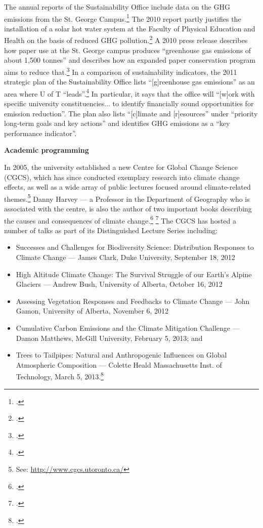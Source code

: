 The annual reports of the Sustainability Office include data on the GHG emissions from the St. George Campus.\footcite[][]{UTSustOffice2010report}
The 2010 report partly justifies the installation of a solar hot water system at the Faculty of Physical Education and Health on the basis of reduced GHG pollution.\footcite[][p. 17]{UTSustOffice2010report}
A 2010 press release describes how paper use at the St. George campus produces ``greenhouse gas emissions of about 1,500 tonnes'' and describes how an expanded paper conservation program aims to reduce that.\footcite[][]{UTGoingGreener2010}
In a comparison of sustainability indicators, the 2011 strategic plan of the Sustainability Office lists ``[g]reenhouse gas emissions'' as an area where U of T ``leads''.\footcite[][p. 1]{UTSustOfficePlan}
In particular, it says that the office will ``[w]ork with specific university constituencies... to identify financially sound opportunities for emission reduction''.
The plan also lists ``[c]limate and [r]esources'' under ``priority long-term goals and key actions'' and identifies GHG emissions as a ``key performance indicator''.




\textbf{Academic programming}
\label{UofTAcademicProgramming}


In 2005, the university established a new Centre for Global Change Science (CGCS), which has since conducted exemplary research into climate change effects, as well as a wide array of public lectures focused around climate-related themes.\footnote{See: \url{http://www.cgcs.utoronto.ca/}}
Danny Harvey --- a Professor in the Department of Geography who is associated with the centre, is also the author of two important books describing the causes and consequences of climate change.\footcite[][]{Harvey1999a} \footcite[][]{Harvey1999b}
The CGCS has hosted a number of talks as part of its Distinguished Lecture Series including:
\begin{itemize}
	\item Successes and Challenges for Biodiversity Science: Distribution Responses to Climate Change --- James Clark, Duke University, September 18, 2012
	\item High Altitude Climate Change: The Survival Struggle of our Earth’s Alpine Glaciers --- Andrew Bush, University of Alberta, October 16, 2012 
	\item Assessing Vegetation Responses and Feedbacks to Climate Change --- John Gamon, University of Alberta, November 6, 2012
	\item Cumulative Carbon Emissions and the Climate Mitigation Challenge --- Damon Matthews, McGill University, February 5, 2013; and
	\item Trees to Tailpipes: Natural and Anthropogenic Influences on Global Atmospheric Composition --- Colette Heald Massachusetts Inst. of Technology, March 5, 2013.\footcite[][]{DistinguishedLecturer}
\end{itemize}



